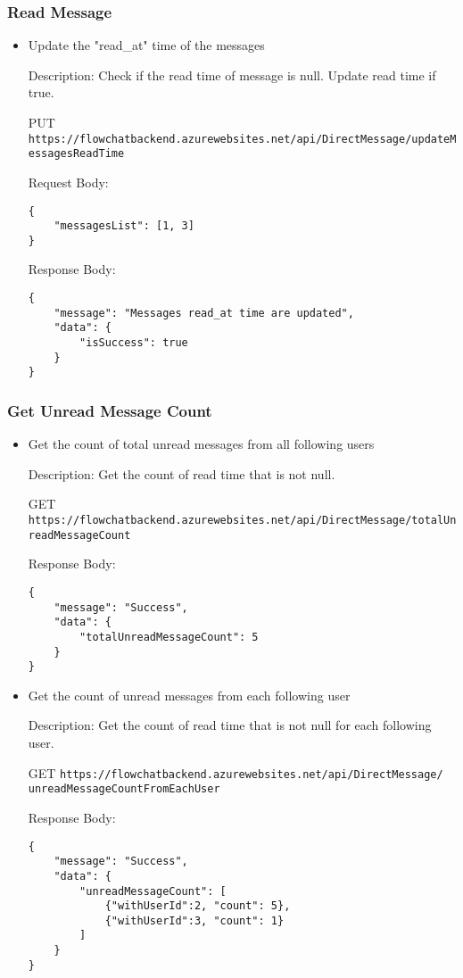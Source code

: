 \documentclass[11pt, a4paper]{article}
\begin{document}
\subsubsection{Read Message}
\begin{itemize}
    \item Update the "read\_at" time of the messages

    Description: Check if the read time of message is null. Update read time if true.
    
    PUT \texttt{https://flowchatbackend.azurewebsites.net/api/DirectMessage/updateMessagesReadTime}
    
    Request Body:
    \begin{lstlisting}[breaklines=true, frame=single]
{
    "messagesList": [1, 3]
}
    \end{lstlisting}
    Response Body:
    \begin{lstlisting}[breaklines=true, frame=single]
{
    "message": "Messages read_at time are updated",
    "data": {
        "isSuccess": true
    }
}
    \end{lstlisting}
\end{itemize}

\subsubsection{Get Unread Message Count}
\begin{itemize}
    \item Get the count of total unread messages from all following users

    Description: Get the count of read time that is not null.
    
    GET \texttt{https://flowchatbackend.azurewebsites.net/api/DirectMessage/totalUnreadMessageCount}
    
    Response Body:
    \begin{lstlisting}[breaklines=true, frame=single]
{
    "message": "Success",
    "data": {
        "totalUnreadMessageCount": 5
    }
}
    \end{lstlisting}

    \item Get the count of unread messages from each following user

    Description: Get the count of read time that is not null for each following user.
    
    GET \texttt{https://flowchatbackend.azurewebsites.net/api/DirectMessage/\\
    unreadMessageCountFromEachUser}
    
    Response Body:    
    \begin{lstlisting}[breaklines=true, frame=single]
{
    "message": "Success",
    "data": {
        "unreadMessageCount": [
            {"withUserId":2, "count": 5},
            {"withUserId":3, "count": 1}
        ]
    }
}
    \end{lstlisting}
    
    
\end{itemize}
\end{document}

